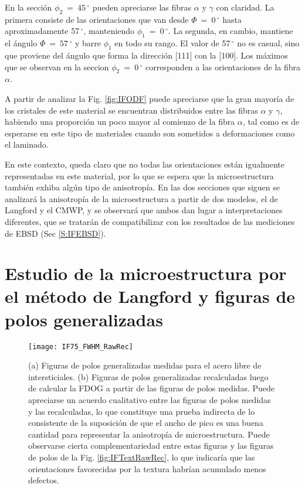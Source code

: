 En la sección $\phi_2 \ = \ 45$\,$^{\circ}$ pueden apreciarse las fibras $\alpha$ y $\gamma$ con claridad. 
La primera consiste de las orientaciones que van desde $\Phi \ = \ 0$\,$^{\circ}$ hasta aproximadamente 57\,$^{\circ}$, manteniendo $\phi_1 \ = \ 0$\,$^{\circ}$.
La segunda, en cambio, mantiene el ángulo $\Phi \ = \ 57$\,$^{\circ}$ y barre $\phi_1$ en todo su rango. El valor de 57\,$^{\circ}$ no es casual, sino que proviene del ángulo que forma la dirección [111] con la [100].
Los máximos que se observan en la seccion $\phi_2 \ = \ 0$\,$^{\circ}$ corresponden a las orientaciones de la fibra $\alpha$.

A partir de analizar la Fig. \ref{fig:IFODF} puede apreciarse que la gran mayoría de los cristales de este material se encuentran distribuidos entre las fibras $\alpha$ y $\gamma$, habiendo una proporción un poco mayor al comienzo de la fibra $\alpha$, tal como es de esperarse en este tipo de materiales cuando son sometidos a deformaciones como el laminado.

En este contexto, queda claro que no todas las orientaciones están igualmente representadas en este material, por lo que se espera que la microestructura también exhiba algún tipo de anisotropía.
En las dos secciones que siguen se analizará la anisotropía de la microestructura a partir de dos modelos, el de Langford y el CMWP, y se observará que ambos dan lugar a interpretaciones diferentes, que se tratarán de compatibilizar con los resultados de las mediciones de EBSD (Sec \ref{S:IFEBSD}).

\section{Estudio de la microestructura por el método de Langford y figuras de polos generalizadas}\label{S:IFLANG}

\begin{figure}[!htb]
  \centering
  \texttt{[image: IF75\_FWHM\_RawRec]}
  \caption{(a) Figuras de polos generalizadas medidas para el acero libre de intersticiales. (b) Figuras de polos generalizadas recalculadas luego de calcular la FDOG a partir de las figuras de polos medidas. Puede apreciarse un acuerdo cualitativo entre las figuras de polos medidas y las recalculadas, lo que constituye una prueba indirecta de lo consistente de la suposición de que el ancho de pico es una buena cantidad para representar la anisotropía de microestructura. Puede observarse cierta complementariedad entre estas figuras y las figuras de polos de la Fig. \ref{fig:IFTextRawRec}, lo que indicaría que las orientaciones favorecidas por la textura habrían acumulado menos defectos.}
  \label{fig:IFFWHMRawRec}
\end{figure}

